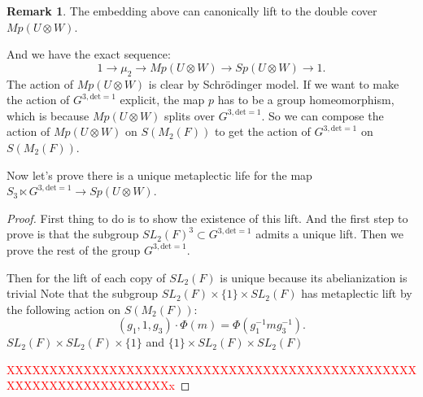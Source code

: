 \documentclass[12pt,a4paper,english]{article}
\theoremstyle{plain}
\theoremstyle{definition}
\newtheorem*{rem}{Remark}
\begin{document}
\begin{rem}
The embedding above can canonically lift to the double cover $Mp(U\otimes W)$.
\begin{center}
\end{center}
And we have the exact sequence:
\begin{equation*}
    1\rightarrow \mu_{2}\rightarrow Mp(U\otimes W)\rightarrow Sp(U\otimes W)\rightarrow 1.
\end{equation*} 
The action of $Mp(U\otimes W)$ is clear by Schr\"{o}dinger model. If we want to make the action of $G^{3 ,\text{det}=1}$ explicit, the map $p$ has to be a group homeomorphism, which is because $Mp(U\otimes W)$ splits over $G^{3, \text{det}=1}$. So we can compose the action of $Mp(U\otimes W)$ on $S(M_{2}(F))$ to get the action of $G^{3, \text{det}=1}$ on $S(M_{2}(F))$.


\end{rem}
Now let's prove there is a unique metaplectic life for the map $S_{3}\ltimes G^{3, \text{det}=1}\rightarrow Sp(U\otimes W)$.
\begin{proof}
First thing to do is to show the existence of this lift. And the first step to prove is that the subgroup $SL_{2}(F)^{3}\subset G^{3,\text{det}=1}$ admits a unique lift. Then we prove the rest of the group $G^{3,\text{det}=1}$. 

Then for the lift of each copy of $SL_{2}(F)$ is unique because its abelianization is trivial Note that the subgroup $SL_{2}(F)\times\{1\}\times SL_{2}(F)$ has metaplectic lift by the following action on $S(M_{2}(F))$:
\begin{equation*}
    (g_{1},1,g_{3})\cdot \Phi(m)=\Phi(g_{1}^{-1}mg^{-1}_{3}).
\end{equation*}
$SL_{2}(F)\times SL_{2}(F)\times\{1\}$ and $\{1\}\times SL_{2}(F)\times SL_{2}(F)$

\textcolor{red}{XXXXXXXXXXXXXXXXXXXXXXXXXXXXXXXXXXXXXXXXXXXXXXXXXXXXXXXXXXXXXXXXXXXx}
\end{proof}
\end{document}
